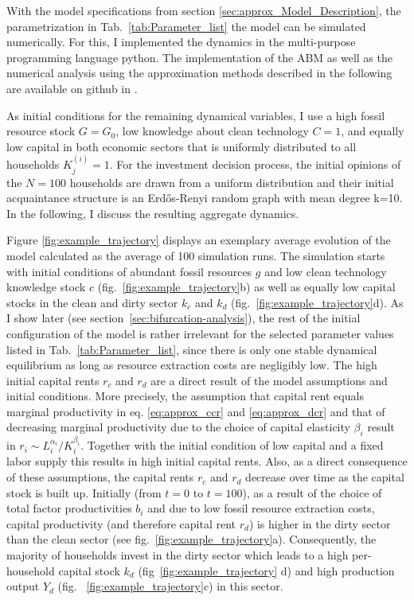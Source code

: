 With the model specifications from section \ref{sec:approx_Model_Description}, the parametrization in Tab.~\ref{tab:Parameter_list} the model can be simulated numerically.
For this, I implemented the dynamics in the multi-purpose programming language python. The implementation of the ABM as well as the numerical analysis using the approximation methods described in the following are available on github in \cite{kolb2018}.

As initial conditions for the remaining dynamical variables, I use a high fossil resource stock $G=G_0$, low knowledge about clean technology $C=1$, and equally low capital in both economic sectors that is uniformly distributed to all households $K_j^{(i)}=1$. For the investment decision process, the initial opinions of the $N=100$ households are drawn from a uniform distribution and their initial acquaintance structure is an Erd\H{o}s-Renyi random graph with mean degree k=10.
In the following, I discuss the resulting aggregate dynamics.



Figure \ref{fig:example_trajectory} displays an exemplary average evolution of the model calculated as the average of 100 simulation runs.
The simulation starts with initial conditions of abundant fossil resources $g$ and low clean technology knowledge stock $c$ (fig.~\ref{fig:example_trajectory}b) as well as equally low capital stocks in the clean and dirty sector $k_c$ and $k_d$ (fig.~\ref{fig:example_trajectory}d). As I show later (see section~\ref{sec:bifurcation-analysis}), the rest of the initial configuration of the model is rather irrelevant for the selected parameter values listed in Tab.~\ref{tab:Parameter_list}, since there is only one stable dynamical equilibrium as long as resource extraction costs are negligibly low.
The high initial capital rents $r_c$ and $r_d$ are a direct result of the model assumptions and initial conditions. More precisely, the assumption that capital rent equals marginal productivity in eq. \eqref{eq:approx_ccr} and \eqref{eq:approx_dcr} and that of decreasing marginal productivity due to the choice of capital elasticity $\beta_i$  result in $r_i \sim L_i^{\alpha_i}/K_i^{\beta_i}$. Together with the initial condition of low capital and a fixed labor supply this results in high initial capital rents. Also, as a direct consequence of these assumptions, the capital rents $r_c$ and $r_d$ decrease over time as the capital stock is built up.
Initially (from $t=0$ to $t=100$), as a result of the choice of total factor productivities $b_i$ and due to low fossil resource extraction costs, capital productivity (and therefore capital rent $r_d$) is higher in the dirty sector than the clean sector (see fig.~\ref{fig:example_trajectory}a). 
Consequently, the majority of households invest in the dirty sector which leads to a high per-household capital stock $k_d$ (fig~\ref{fig:example_trajectory} d) and high production output $Y_d$ (fig. ~\ref{fig:example_trajectory}c) in this sector.

